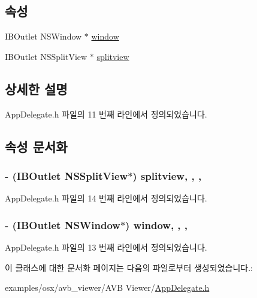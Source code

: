 \subsection*{속성}
\begin{DoxyCompactItemize}
\item 
I\+B\+Outlet N\+S\+Window $\ast$ \hyperlink{interface_app_delegate_adfe23c721bf6a723e13a5076b9ca08b2}{window}
\item 
I\+B\+Outlet N\+S\+Split\+View $\ast$ \hyperlink{interface_app_delegate_a4baea43b030a35d4e98366a888655007}{splitview}
\end{DoxyCompactItemize}


\subsection{상세한 설명}


App\+Delegate.\+h 파일의 11 번째 라인에서 정의되었습니다.



\subsection{속성 문서화}
\subsubsection[{\texorpdfstring{splitview}{splitview}}]{\setlength{\rightskip}{0pt plus 5cm}-\/ (I\+B\+Outlet N\+S\+Split\+View$\ast$) splitview\hspace{0.3cm}{\ttfamily [read]}, {\ttfamily [write]}, {\ttfamily [atomic]}, {\ttfamily [weak]}}\hypertarget{interface_app_delegate_a4baea43b030a35d4e98366a888655007}{}\label{interface_app_delegate_a4baea43b030a35d4e98366a888655007}


App\+Delegate.\+h 파일의 14 번째 라인에서 정의되었습니다.

\subsubsection[{\texorpdfstring{window}{window}}]{\setlength{\rightskip}{0pt plus 5cm}-\/ (I\+B\+Outlet N\+S\+Window$\ast$) window\hspace{0.3cm}{\ttfamily [read]}, {\ttfamily [write]}, {\ttfamily [atomic]}, {\ttfamily [assign]}}\hypertarget{interface_app_delegate_adfe23c721bf6a723e13a5076b9ca08b2}{}\label{interface_app_delegate_adfe23c721bf6a723e13a5076b9ca08b2}


App\+Delegate.\+h 파일의 13 번째 라인에서 정의되었습니다.



이 클래스에 대한 문서화 페이지는 다음의 파일로부터 생성되었습니다.\+:\begin{DoxyCompactItemize}
\item 
examples/osx/avb\+\_\+viewer/\+A\+V\+B Viewer/\hyperlink{_app_delegate_8h}{App\+Delegate.\+h}\end{DoxyCompactItemize}
